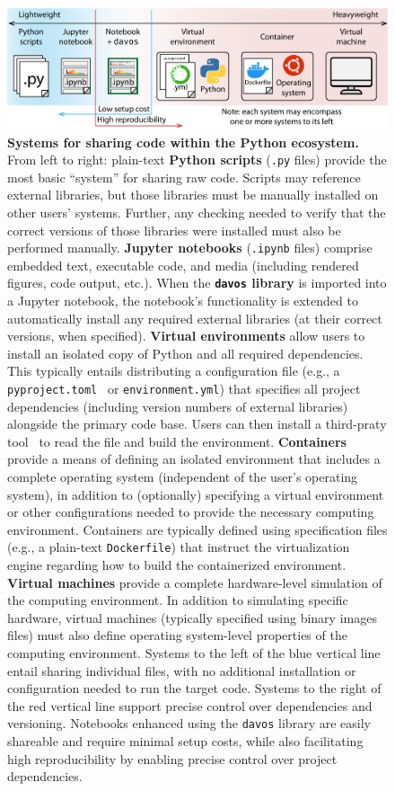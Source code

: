 \documentclass[preprint,12pt,a4paper]{elsarticle}
\begin{document}
\begin{figure}[tp]
\centering
\includegraphics[width=\textwidth]{figs/shareable_code}
\caption{\small \textbf{Systems for sharing code within the Python
    ecosystem.}  From left to right: plain-text \textbf{Python
    scripts} (\texttt{.py} files) provide the most basic ``system''
  for sharing raw code.  Scripts may reference external libraries, but
  those libraries must be manually installed on other users' systems.
  Further, any checking needed to verify that the correct versions of
  those libraries were installed must also be performed manually.
  \textbf{Jupyter notebooks} (\texttt{.ipynb} files) comprise embedded
  text, executable code, and media (including rendered figures, code
  output, etc.).  When the \textbf{\texttt{davos} library} is imported
  into a Jupyter notebook, the notebook's functionality is extended to
  automatically install any required external libraries (at their
  correct versions, when specified).  \textbf{Virtual environments}
  allow users to install an isolated copy of Python and all required
  dependencies. This typically entails distributing a configuration file
  (e.g., a \texttt{pyproject.toml}~\cite{CannEtal16} or \texttt{environment.yml})
  that specifies all project dependencies (including version numbers of
  external libraries) alongside the primary code base. Users can then install
  a third-praty tool~\cite[e.g.,][]{Anac12, Eust19} to read the file and build the environment.
  \textbf{Containers} provide a means of defining an isolated
  environment that includes a complete operating system (independent
  of the user's operating system), in addition to (optionally)
  specifying a virtual environment or other configurations needed to
  provide the necessary computing environment.  Containers are
  typically defined using specification files (e.g., a plain-text
  \texttt{Dockerfile}) that instruct the virtualization engine
  regarding how to build the containerized environment.  \textbf{Virtual
    machines} provide a complete hardware-level simulation of the
  computing environment.  In addition to simulating specific hardware,
  virtual machines (typically specified using binary images files)
  must also define operating system-level properties of the computing
  environment.  Systems to the left of the blue vertical line entail
  sharing individual files, with no additional installation or
  configuration needed to run the target code.  Systems to the right
  of the red vertical line support precise control over dependencies
  and versioning.  Notebooks enhanced using the \texttt{davos} library
  are easily shareable and require minimal setup costs, while also
  facilitating high reproducibility by enabling precise control over
  project dependencies.}
\label{fig:code-sharing}
\end{figure}
\end{document}
